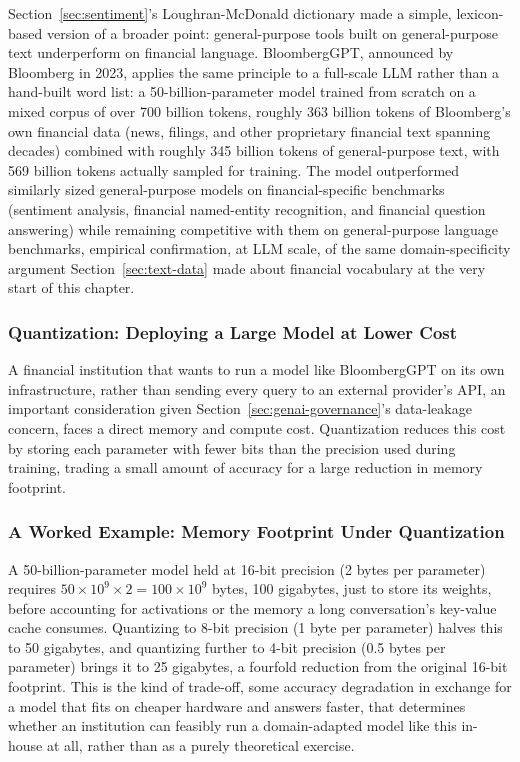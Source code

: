 \documentclass[../ai_in_finance]{subfiles}
\begin{document}
Section~\ref{sec:sentiment}'s Loughran-McDonald dictionary made a simple, lexicon-based version of a broader point: general-purpose tools built on general-purpose text underperform on financial language. BloombergGPT, announced by Bloomberg in 2023, applies the same principle to a full-scale LLM rather than a hand-built word list: a 50-billion-parameter model trained from scratch on a mixed corpus of over 700 billion tokens, roughly 363 billion tokens of Bloomberg's own financial data (news, filings, and other proprietary financial text spanning decades) combined with roughly 345 billion tokens of general-purpose text, with 569 billion tokens actually sampled for training. The model outperformed similarly sized general-purpose models on financial-specific benchmarks (sentiment analysis, financial named-entity recognition, and financial question answering) while remaining competitive with them on general-purpose language benchmarks, empirical confirmation, at LLM scale, of the same domain-specificity argument Section~\ref{sec:text-data} made about financial vocabulary at the very start of this chapter.

\subsubsection*{Quantization: Deploying a Large Model at Lower Cost}

A financial institution that wants to run a model like BloombergGPT on its own infrastructure, rather than sending every query to an external provider's API, an important consideration given Section~\ref{sec:genai-governance}'s data-leakage concern, faces a direct memory and compute cost. Quantization reduces this cost by storing each parameter with fewer bits than the precision used during training, trading a small amount of accuracy for a large reduction in memory footprint.

\subsubsection*{A Worked Example: Memory Footprint Under Quantization}
A 50-billion-parameter model held at 16-bit precision (2 bytes per parameter) requires $50\times10^9 \times 2 = 100\times10^9$ bytes, 100 gigabytes, just to store its weights, before accounting for activations or the memory a long conversation's key-value cache consumes. Quantizing to 8-bit precision (1 byte per parameter) halves this to 50 gigabytes, and quantizing further to 4-bit precision (0.5 bytes per parameter) brings it to 25 gigabytes, a fourfold reduction from the original 16-bit footprint. This is the kind of trade-off, some accuracy degradation in exchange for a model that fits on cheaper hardware and answers faster, that determines whether an institution can feasibly run a domain-adapted model like this in-house at all, rather than as a purely theoretical exercise.
\end{document}
